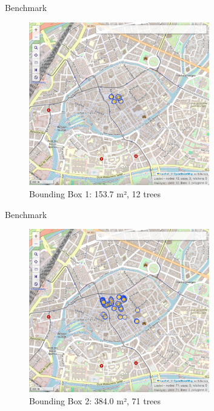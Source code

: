 \documentclass[10pt]{beamer}
\begin{document}
\begin{frame}{Benchmark}
  \Large
  \begin{figure}[H]
    \centering
    \includegraphics[width=0.7\textwidth]{images/bbox1.png}
    \caption{Bounding Box 1: 153.7 m², 12 trees}
\end{figure}
\end{frame}

\begin{frame}{Benchmark}
  \Large
  \begin{figure}[H]
    \centering
    \includegraphics[width=0.7\textwidth]{images/bbox2.png}
    \caption{Bounding Box 2: 384.0 m², 71 trees}
\end{figure}
\end{frame}
\end{document}
